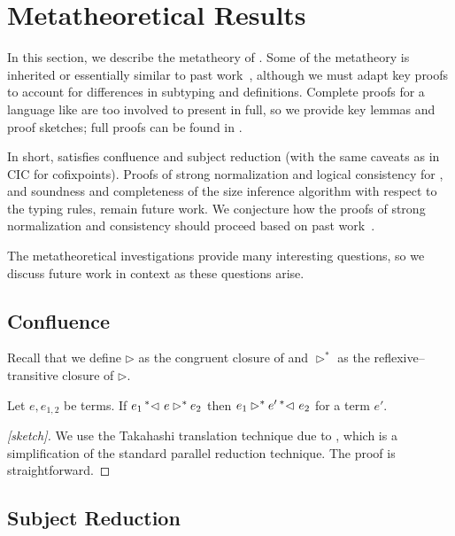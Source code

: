 \section{Metatheoretical Results}
\label{sec:metatheory}

In this section, we describe the metatheory of \lang.
Some of the metatheory is inherited or essentially similar to past work~\citep{cic-hat-minus,cc-hat-omega,cic-hat}, although we must adapt key proofs to account for differences in subtyping and definitions.
Complete proofs for a language like \lang are too involved to present in full, so we provide key lemmas and proof sketches; full proofs can be found in \anotherpdf.

In short, \lang satisfies confluence and subject reduction (with the same caveats as in CIC for cofixpoints).
Proofs of strong normalization and logical consistency for \lang, and soundness and completeness of the size inference algorithm with respect to the typing rules, remain future work.
We conjecture how the proofs of strong normalization and consistency should proceed based on past work~\citep{cic-hat-minus,cc-hat-omega,cic-hat}.

The metatheoretical investigations provide many interesting questions, so we discuss future work in context as these questions arise.

\subsection{Confluence}

Recall that we define $\rhd$ as the congruent closure of \reduction and $\rhd^*$ as the reflexive--transitive closure of $\rhd$.

\begin{theorem}[Confluence]
\label{thm:metatheory:confluence}
  Let $e, e_{1,2}$ be terms.
  If $e_1 \prescript{*}{}{\lhd ~ } e \rhd^* e_2$ then
  $e_1 \rhd^* e' \prescript{*}{}{\lhd ~ } e_2$
  for a term $e'$.
\end{theorem}
%
\begin{proof}[{[sketch]}]
  We use the Takahashi translation technique due to \citet{takahashitrans}, which is a simplification of the standard
  parallel reduction technique.
  The proof is straightforward.
\end{proof}

\subsection{Subject Reduction}
\label{sec:meta:sub-red}

